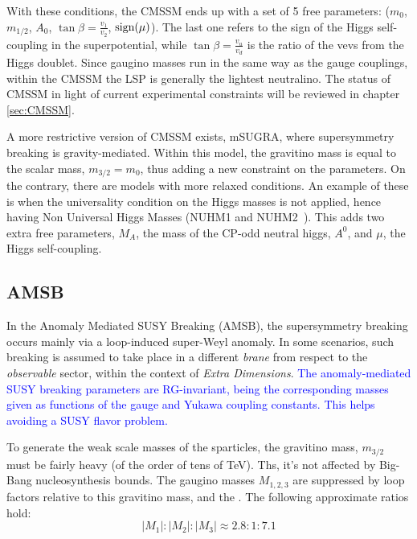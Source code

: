 With these conditions, the CMSSM ends up with a set of 5 free parameters: ($m_0$, $m_{1/2}$, $A_0$, $\tan{\beta} = \frac{v_1}{v_2}$, $\rm sign(\mu)$). The last one refers to the sign of the Higgs self-coupling in the superpotential, while $\tan{\beta} = \frac{v_u}{v_d}$ is the ratio of the vevs from the Higgs doublet. Since gaugino masses run in the same way as the gauge couplings, within the CMSSM the LSP is generally the lightest neutralino. The status of CMSSM in light of current experimental constraints will be reviewed in chapter \ref{sec:CMSSM}.  %

A more restrictive version of CMSSM exists, mSUGRA, where supersymmetry breaking is gravity-mediated. Within this model, the gravitino mass is equal to the scalar mass, $m_{3/2} = m_0$, thus adding a new constraint on the parameters. On the contrary, there are models with more relaxed conditions. An example of these is when the universality condition on the Higgs masses is not applied, hence having Non Universal Higgs Masses (NUHM1 and NUHM2~\cite{Ellis:2002wv}). This adds two extra free parameters, $M_A$, the mass of the CP-odd neutral higgs, $A^0$, and $\mu$, the Higgs self-coupling.  %

\subsection{AMSB}
\label{sec:AMSB}
In the Anomaly Mediated SUSY Breaking (AMSB), the supersymmetry breaking occurs mainly via a loop-induced super-Weyl anomaly. In some scenarios, such breaking is assumed to take place in a different \textit{brane} from respect to the \textit{observable} sector, within the context of \textit{Extra Dimensions}. \textcolor{blue}{The anomaly-mediated SUSY breaking parameters are RG-invariant, being the corresponding masses given as functions of the gauge and Yukawa coupling constants. This helps avoiding a SUSY flavor problem.}

To generate the weak scale masses of the sparticles, the gravitino mass, $m_{3/2}$ must be fairly heavy (of the order of tens of TeV). Ths, it's not affected by Big-Bang nucleosynthesis bounds.  
The gaugino masses $M_{1,2,3}$ are suppressed by loop factors relative to this gravitino mass, and the . The following approximate ratios hold:
\begin{equation}
|M_1| : |M_2| : |M_3| \approx 2.8 : 1 : 7.1
\end{equation}

